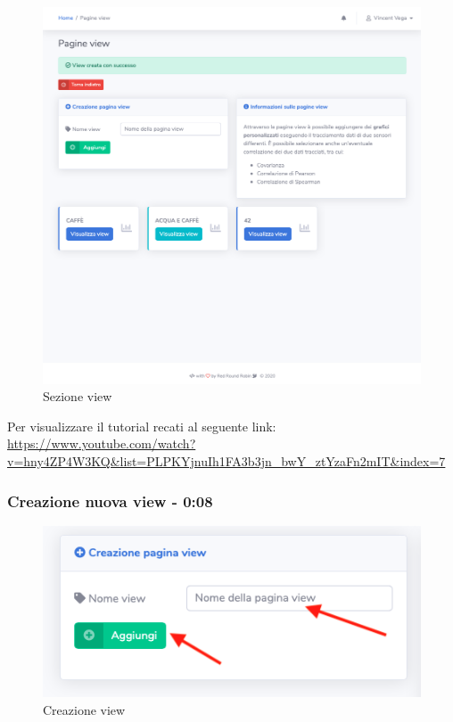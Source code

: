 	\begin{figure}[H]
		\centering
		\includegraphics[scale=0.600]{res/images/membro/view.png}
		\caption{Sezione view}
	\end{figure}

	Per visualizzare il tutorial recati al seguente link: 
	\url{https://www.youtube.com/watch?v=hny4ZP4W3KQ&list=PLPKYjnuIh1FA3b3jn_bwY_ztYzaFn2mIT&index=7}

	\subsubsection{Creazione nuova view - 0:08}
	\begin{figure}[H]
		\centering
		\includegraphics[scale=0.600]{res/images/membro/creazView.png}
		\caption{Creazione view}
	\end{figure}

